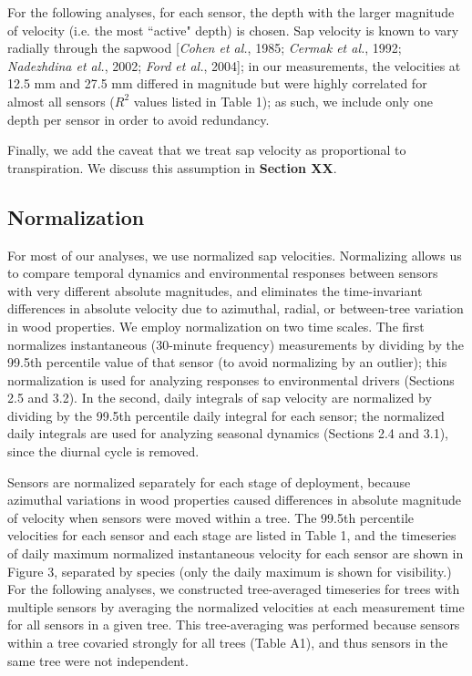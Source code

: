 For the following analyses, for each sensor, the depth with the larger magnitude of velocity (i.e. the most ``active" depth) is chosen.  Sap velocity is known to vary radially through the sapwood [\textit{Cohen et al.}, 1985; \textit{Cermak et al.}, 1992; \textit{Nadezhdina et al.}, 2002; \textit{Ford et al.}, 2004]; in our measurements, the velocities at 12.5 mm and 27.5 mm differed in magnitude but were highly correlated for almost all sensors ($R^2$ values listed in Table 1); as such, we include only one depth per sensor in order to avoid redundancy.

Finally, we add the caveat that we treat sap velocity as proportional to transpiration.  We discuss this assumption in \textbf{Section XX}.

\subsection{Normalization}
For most of our analyses, we use normalized sap velocities.  Normalizing allows us to compare temporal dynamics and environmental responses between sensors with very different absolute magnitudes, and eliminates the time-invariant differences in absolute velocity due to azimuthal, radial, or between-tree variation in wood properties.  We employ normalization on two time scales.   The first normalizes instantaneous (30-minute frequency) measurements by dividing by the 99.5th percentile value of that sensor (to avoid normalizing by an outlier); this normalization is used for analyzing responses to environmental drivers (Sections 2.5 and 3.2).  In the second, daily integrals of sap velocity are normalized by dividing by the 99.5th percentile daily integral for each sensor; the normalized daily integrals are used for analyzing seasonal dynamics (Sections 2.4 and 3.1), since the diurnal cycle is removed.

Sensors are normalized separately for each stage of deployment, because azimuthal variations in wood properties caused differences in absolute magnitude of velocity when sensors were moved within a tree.  The 99.5th percentile velocities for each sensor and each stage are listed in Table 1, and the timeseries of daily maximum normalized instantaneous velocity for each sensor are shown in Figure 3, separated by species (only the daily maximum is shown for visibility.)  For the following analyses, we constructed tree-averaged timeseries for trees with multiple sensors by averaging the normalized velocities at each measurement time for all sensors in a given tree.  This tree-averaging was performed because sensors within a tree covaried strongly for all trees (Table A1), and thus sensors in the same tree were not independent.

